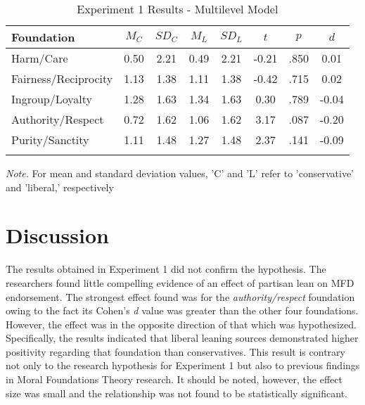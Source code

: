 \documentclass[english,,man]{apa6}
\begin{document}
\begin{table}[tbp]

\begin{center}
\begin{threeparttable}

\caption{\label{tab:exp1-table}Experiment 1 Results - Multilevel Model}

\begin{tabular}{lccccccc}
\toprule
Foundation & $M_C$ & $SD_C$ & $M_L$ & $SD_L$ & $t$ & $p$ & $d$\\
\midrule
Harm/Care & 0.50 & 2.21 & 0.49 & 2.21 & -0.21 & .850 & 0.01\\
Fairness/Reciprocity & 1.13 & 1.38 & 1.11 & 1.38 & -0.42 & .715 & 0.02\\
Ingroup/Loyalty & 1.28 & 1.63 & 1.34 & 1.63 & 0.30 & .789 & -0.04\\
Authority/Respect & 0.72 & 1.62 & 1.06 & 1.62 & 3.17 & .087 & -0.20\\
Purity/Sanctity & 1.11 & 1.48 & 1.27 & 1.48 & 2.37 & .141 & -0.09\\
\bottomrule
\addlinespace
\end{tabular}

\begin{tablenotes}[para]
\normalsize{\textit{Note.} For mean and standard deviation values, 'C' and 'L' refer to 'conservative' and 'liberal,' respectively}
\end{tablenotes}

\end{threeparttable}
\end{center}

\end{table}

\hypertarget{discussion}{%
\section{Discussion}\label{discussion}}

The results obtained in Experiment 1 did not confirm the hypothesis. The researchers found little compelling evidence of an effect of partisan lean on MFD endorsement. The strongest effect found was for the \emph{authority/respect} foundation owing to the fact its Cohen's \emph{d} value was greater than the other four foundations. However, the effect was in the opposite direction of that which was hypothesized. Specifically, the results indicated that liberal leaning sources demonstrated higher positivity regarding that foundation than conservatives. This result is contrary not only to the research hypothesis for Experiment 1 but also to previous findings in Moral Foundations Theory research. It should be noted, however, the effect size was small and the relationship was not found to be statistically significant.
\end{document}
